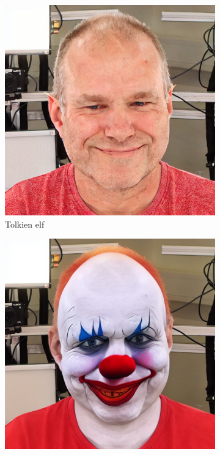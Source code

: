 \begin{figure}
\begin{subfigure}{0.18\linewidth}
        \includegraphics[width=\textwidth]{Figures/naive/low_cfg/ipix2pix_sven_elf/0-2-4-2-293_210300_829.png}
        \caption{Tolkien elf}
	\end{subfigure}
    \begin{subfigure}{0.18\linewidth}
        \includegraphics[width=\textwidth]{Figures/naive/default/ipix2pix_sven_clown/0-2-4-2-293_210300_829.png}

\end{subfigure}
\end{figure}
